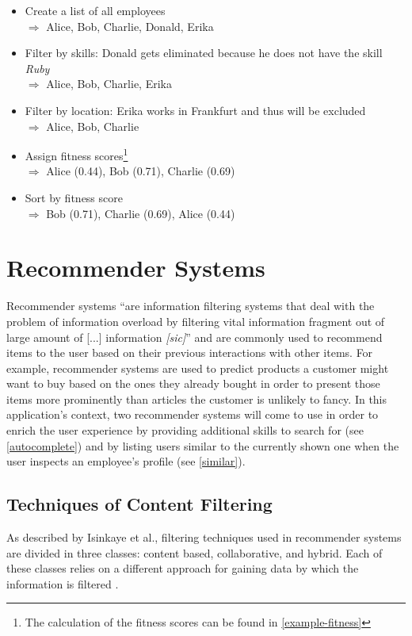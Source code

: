 \begin{itemize}
  \item Create a list of all employees\\
    $\Rightarrow$ Alice, Bob, Charlie, Donald, Erika
  \item Filter by skills: Donald gets eliminated because he does not have the skill \textit{Ruby}\\
    $\Rightarrow$ Alice, Bob, Charlie, Erika
  \item Filter by location: Erika works in Frankfurt and thus will be excluded\\
    $\Rightarrow$ Alice, Bob, Charlie
  \item Assign fitness scores\footnote{The calculation of the fitness scores can be found in \ref{example-fitness}}\\
    $\Rightarrow$ Alice (0.44), Bob (0.71), Charlie (0.69)
  \item Sort by fitness score\\
    $\Rightarrow$ Bob (0.71), Charlie (0.69), Alice (0.44)
\end{itemize}


\section{Recommender Systems}
Recommender systems ``are information filtering systems that deal with the problem of information overload by filtering vital information fragment out of large amount of [...] information \textit{[sic]}'' \cite{Isinkaye2015261}\label{recommender-definition} and are commonly used to recommend items to the user based on their previous interactions with other items. For example, recommender systems are used to predict products a customer might want to buy based on the ones they already bought in order to present those items more prominently than articles the customer is unlikely to fancy. In this application's context, two recommender systems will come to use in order to enrich the user experience by providing additional skills to search for (see \ref{autocomplete}) and by listing users similar to the currently shown one when the user inspects an employee's profile (see \ref{similar}).

\subsection{Techniques of Content Filtering}
As described by Isinkaye et al., filtering techniques used in recommender systems are divided in three classes: content based, collaborative, and hybrid. Each of these classes relies on a different approach for gaining data by which the information is filtered \cite{Isinkaye2015261}.

